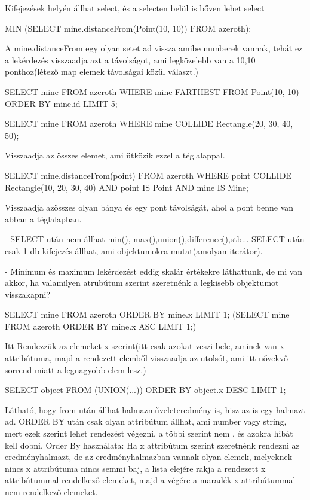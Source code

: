 \begin{sql}
Kifejezések helyén állhat select, és a selecten belül is bőven lehet select

\begin{sql}
MIN (SELECT mine.distanceFrom(Point(10, 10)) FROM azeroth);
\end{sql}
A mine.distanceFrom egy olyan setet ad vissza amibe numberek vannak, tehát ez a lekérdezés visszaadja azt a távolságot, ami legközelebb van
a 10,10 ponthoz(létező map elemek távolságai közül választ.)

\begin{sql}
SELECT mine
FROM azeroth
WHERE mine FARTHEST FROM Point(10, 10)
ORDER BY mine.id
LIMIT 5;
\end{sql}

\begin{sql}
SELECT mine
FROM azeroth
WHERE mine COLLIDE Rectangle(20, 30, 40, 50);
\end{sql}
Visszaadja az összes elemet, ami ütközik ezzel a téglalappal.

\begin{sql}
SELECT mine.distanceFrom(point)
FROM azeroth
WHERE
point COLLIDE Rectangle(10, 20, 30, 40) AND
point IS Point AND
mine IS Mine;
\end{sql}
Visszaadja azösszes olyan bánya és egy pont távolságát, ahol a pont benne van abban a téglalapban.

- SELECT után nem állhat min(), max(),union(),difference(),stb...
SELECT után csak 1 db kifejezés állhat, ami objektumokra mutat(amolyan iterátor).

- Minimum és maximum lekérdezést eddig skalár értékekre láthattunk, de mi van akkor, ha valamilyen atrubútum szerint szeretnénk a legkisebb objektumot visszakapni?

\begin{sql}
SELECT mine FROM azeroth ORDER BY mine.x LIMIT 1;
(SELECT mine FROM azeroth ORDER BY mine.x ASC LIMIT 1;)
\end{sql}
Itt Rendezzük az elemeket x szerint(itt csak azokat veszi bele, aminek van x attribútuma, majd a rendezett elemből visszaadja az utolsót, ami itt nővekvő sorrend miatt a legnagyobb elem lesz.)

\begin{sql}
SELECT object FROM (UNION(...)) ORDER BY object.x DESC LIMIT 1;
\end{sql}
Látható, hogy from után állhat halmazműveleteredmény is, hisz az is egy halmazt ad. ORDER BY után csak olyan attribútum állhat, ami number vagy string, mert ezek szerint lehet rendezést végezni, a többi szerint nem , és azokra hibát kell dobni.
Order By használata: Ha x attribútum szerint szeretnénk rendezni az eredményhalmazt, de az eredményhalmazban vannak olyan elemek, melyeknek nincs x attribútuma nincs semmi baj, a lista elejére rakja a rendezett x attribútummal rendelkező elemeket, majd a végére a maradék x attribútummal nem rendelkező elemeket. 


\end{sql}
